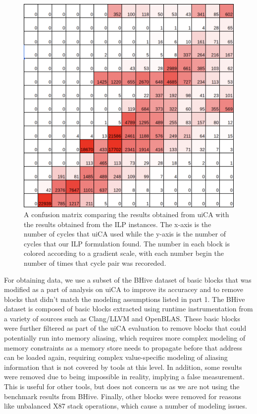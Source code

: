 \documentclass[sigconf]{acmart}
\begin{document}
\begin{figure}[t]
  \centering
  \includegraphics[width=0.6\linewidth]{confusion_matrix.png}
  \caption{A confusion matrix comparing the results obtained from uiCA with the results obtained from the ILP
  instances. The x-axis is the number of cycles that uiCA used while the y-axis is the number of cycles that
  our ILP formulation found. The number in each block is colored according to a gradient scale, with each
  number begin the number of times that cycle pair was recoreded.}
  \label{figure:confusion-matrix}
\end{figure}

For obtaining data, we use a subset of the BHive \cite{chen2019bhive} dataset of basic blocks that was modified as
a part of analysis on uiCA \cite{abel2022uica} to improve its accuracey and to remove blocks that didn't match
the modeling assumptions listed in part 1. The BHive dataset is composed of basic blocks extracted using runtime
instrumentation from a variety of sources such as Clang/LLVM and OpenBLAS. These basic blocks were further filtered
as part of the uiCA evaluation to remove blocks that could potentially run into memory aliasing, which requires
more complex modeling of memory constraints as a memory store needs to propagate before that address can be
loaded again, requiring complex value-specific modeling of aliasing information that is not covered by tools at this
level. In addition, some results were removed due to being impossible in reality, implying a false measurement. This
is useful for other tools, but does not concern us as we are not using the benchmark results from BHive. Finally,
other blocks were removed for reasons like unbalanced X87 stack operations, which cause a number of modeling issues.
\end{document}
